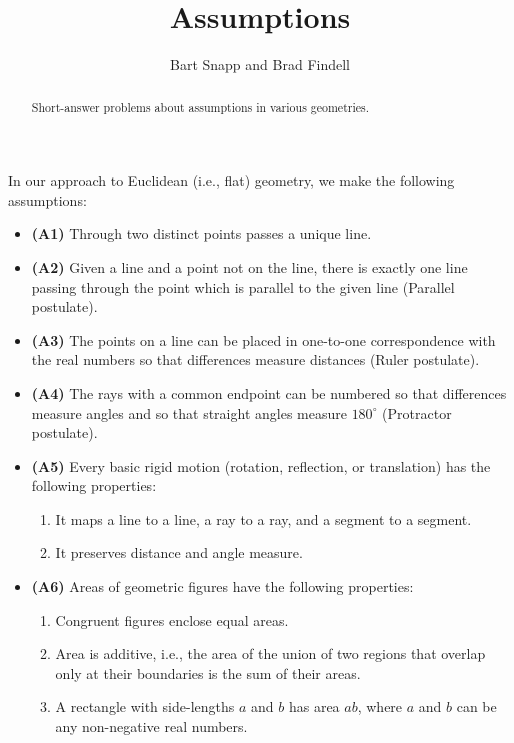 \documentclass[nooutcomes]{ximera}
\title{Assumptions}
\author{Bart Snapp and Brad Findell}
\begin{document}
\begin{abstract}
Short-answer problems about assumptions in various geometries.
\end{abstract}
\maketitle

In our approach to Euclidean (i.e., flat) geometry, we make the following assumptions:
\begin{itemize}
\item \textbf{(A1)} Through two distinct points passes a unique line.
\item \textbf{(A2)} Given a line and a point not on the line, there is exactly one line passing through the point which is parallel to the given line (Parallel postulate).
\item \textbf{(A3)} The points on a line can be placed in one-to-one correspondence with the real numbers so that differences measure distances (Ruler postulate).  
\item \textbf{(A4)} The rays with a common endpoint can be numbered so that differences measure angles and so that straight angles measure $180^\circ$ (Protractor postulate). 
\item \textbf{(A5)} Every basic rigid motion (rotation, reflection, or translation) has the following properties:
\begin{enumerate}
\item It maps a line to a line, a ray to a ray, and a segment to a segment.
\item It preserves distance and angle measure.
\end{enumerate}
\item \textbf{(A6)} Areas of geometric figures have the following properties: 
\begin{enumerate}
\item Congruent figures enclose equal areas.
\item Area is additive, i.e., the area of the union of two regions that overlap only at their boundaries is the sum of their areas. 
\item A rectangle with side-lengths $a$ and $b$ has area $ab$, where $a$ and $b$ can be any non-negative real numbers.
\end{enumerate}
\end{itemize}
\end{document}
